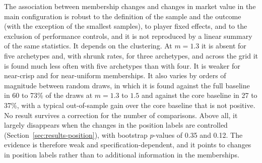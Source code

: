 The association between membership changes and changes in market value in the main configuration is robust to the definition of the sample and the outcome (with the exception of the smallest samples), to player fixed effects, and to the exclusion of performance controls, and it is not reproduced by a linear summary of the same statistics. It depends on the clustering. At $m=1.3$ it is absent for five archetypes and, with shrunk rates, for three archetypes, and across the grid it is found much less often with five archetypes than with four. It is weaker for near-crisp and for near-uniform memberships. It also varies by orders of magnitude between random draws, in which it is found against the full baseline in 60 to 73\% of the draws at $m=1.3$ to $1.5$ and against the core baseline in 27 to 37\%, with a typical out-of-sample gain over the core baseline that is not positive. No result survives a correction for the number of comparisons. Above all, it largely disappears when the changes in the position labels are controlled (Section~\ref{sec:results-position}), with bootstrap $p$-values of 0.35 and 0.12. The evidence is therefore weak and specification-dependent, and it points to changes in position labels rather than to additional information in the memberships.
